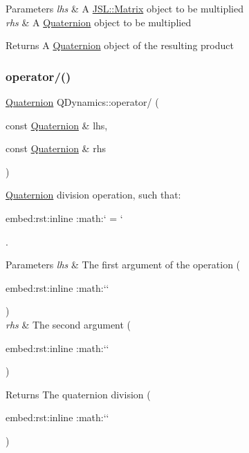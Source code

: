\begin{DoxyParams}{Parameters}
{\em lhs} & A \hyperlink{classJSL_1_1Matrix}{J\+S\+L\+::\+Matrix} object to be multiplied \\
\hline
{\em rhs} & A \hyperlink{classQDynamics_1_1Quaternion}{Quaternion} object to be multiplied \\
\hline
\end{DoxyParams}
\begin{DoxyReturn}{Returns}
A \hyperlink{classQDynamics_1_1Quaternion}{Quaternion} object of the resulting product 
\end{DoxyReturn}
\mbox{\label{namespaceQDynamics_a48d51b6fed1449d7e9a62dac20a169af}} 
\subsubsection{\texorpdfstring{operator/()}{operator/()}}
{\footnotesize\ttfamily \hyperlink{classQDynamics_1_1Quaternion}{Quaternion} Q\+Dynamics\+::operator/ (\begin{DoxyParamCaption}\item[{const \hyperlink{classQDynamics_1_1Quaternion}{Quaternion} \&}]{lhs,  }\item[{const \hyperlink{classQDynamics_1_1Quaternion}{Quaternion} \&}]{rhs }\end{DoxyParamCaption})\hspace{0.3cm}{\ttfamily [inline]}}



\hyperlink{classQDynamics_1_1Quaternion}{Quaternion} division operation, such that\+: 

\begin{DoxyVerb}embed:rst:inline :math:` \oslash {}  =   \otimes {}` \end{DoxyVerb}
. 
\begin{DoxyParams}{Parameters}
{\em lhs} & The first argument of the operation (\begin{DoxyVerb}embed:rst:inline :math:`` \end{DoxyVerb}
) \\
\hline
{\em rhs} & The second argument (\begin{DoxyVerb}embed:rst:inline :math:`` \end{DoxyVerb}
) \\
\hline
\end{DoxyParams}
\begin{DoxyReturn}{Returns}
The quaternion division (\begin{DoxyVerb}embed:rst:inline :math:`\oslash{}` \end{DoxyVerb}
) 
\end{DoxyReturn}


